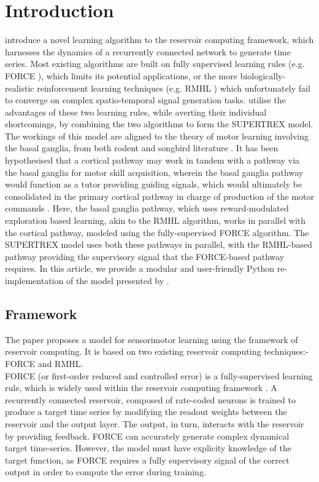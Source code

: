 

\section{Introduction}

\textcite{pyle2019} introduce a novel learning algorithm to the reservoir computing framework, which harnesses the dynamics of a recurrently connected network to generate time series. Most existing algorithms are built on fully supervised learning rules (e.g. FORCE \cite{sussillo2009}), which limits its potential applications, or the more biologically-realistic reinforcement learning techniques (e.g. RMHL \cite{hoerzer2014}) which unfortunately fail to converge on complex spatio-temporal signal generation tasks. \textcite{pyle2019} utilise the advantages of these two learning rules, while averting their individual shortcomings, by combining the two algorithms to form the SUPERTREX model. The workings of this model are aligned to the theory of motor learning involving the basal ganglia, from both rodent and songbird literature \cite{brainard2002}. It has been hypothesised that a cortical pathway may work in tandem with a pathway via the basal ganglia for motor skill acquisition, wherein the basal ganglia pathway would function as a tutor providing guiding signals, which would ultimately be consolidated in the primary cortical pathway in charge of production of the motor commands \cite{olveczky2011}. Here, the basal ganglia pathway, which uses reward-modulated exploration based learning, akin to the RMHL algorithm, works in parallel with the cortical pathway, modeled using the fully-supervised FORCE algorithm. The SUPERTREX model uses both these pathways in parallel, with the RMHL-based pathway providing the supervisory signal that the FORCE-based pathway requires.
%
In this article, we provide a modular and user-friendly Python re-implementation of the model presented by \textcite{pyle2019}.




\subsection{Framework}

The paper \cite{pyle2019} proposes a model for sensorimotor learning using the framework of reservoir computing. It is based on two existing reservoir computing techniques:- FORCE and RMHL.\\

FORCE (or first-order reduced and controlled error) is a fully-supervised learning rule, which is widely used within the reservoir computing framework \cite{sussillo2009}. A recurrently connected reservoir, composed of rate-coded neurons is trained to produce a target time series by modifying the readout weights between the reservoir and the output layer. The output, in turn, interacts with the reservoir by providing feedback. FORCE can accurately generate complex dynamical target time-series. However, the model must have explicity knowledge of the target function, as FORCE requires a fully supervisory signal of the correct output in order to compute the error during training. \\


